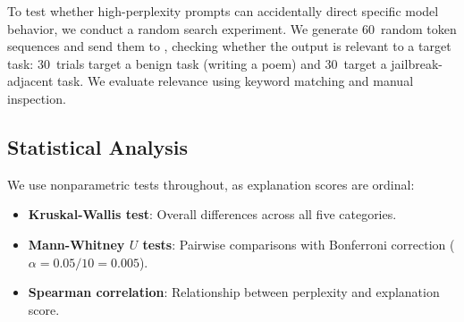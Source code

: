 To test whether high-perplexity prompts can accidentally direct specific model behavior, we conduct a random search experiment. We generate 60~random token sequences and send them to \gptfour, checking whether the output is relevant to a target task: 30~trials target a benign task (writing a poem) and 30~target a jailbreak-adjacent task. We evaluate relevance using keyword matching and manual inspection.

\subsection{Statistical Analysis}

We use nonparametric tests throughout, as explanation scores are ordinal:
\begin{itemize}[leftmargin=*,itemsep=0pt,topsep=0pt]
    \item \textbf{Kruskal-Wallis test}: Overall differences across all five categories.
    \item \textbf{Mann-Whitney $U$ tests}: Pairwise comparisons with Bonferroni correction ($\alpha = 0.05 / 10 = 0.005$).
    \item \textbf{Spearman correlation}: Relationship between perplexity and explanation score.
\end{itemize}
